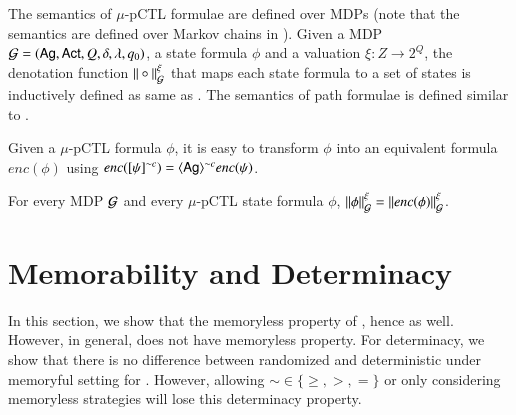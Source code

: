 The semantics of $\mu$-pCTL formulae are defined over MDPs (note that the semantics are defined over Markov chains in \cite{CKP15}).
Given a MDP $\mathcal{G}=(\textsf{Ag},\textsf{Act}, Q, \delta,\lambda,q_0)$, a state formula $\phi$ and a valuation $\xi:Z\rightarrow 2^Q$,
the denotation function $\|\circ\|_{\mathcal{G}}^\xi$ that maps each state formula to a set of states is inductively defined as same as \pamc.
The semantics of path formulae is defined similar to \pamcc.

Given a $\mu$-pCTL formula $\phi$, it is easy to transform $\phi$ into an equivalent \pamcc formula
$enc(\phi)$ using  $enc([\psi]^{\sim c}) = \langle{\textsf{Ag}}\rangle^{\sim c} enc(\psi)$.


\begin{theorem}
For every MDP $\mathcal{G}$ and every $\mu$-pCTL state formula $\phi$, $\|{\phi}\|_{\mathcal{G}}^\xi=\|{enc(\phi)}\|_{\mathcal{G}}^\xi$.
\end{theorem}



\section{Memorability and Determinacy}
In this section, we show that the memoryless property of \pamcc,  hence \pamcs as well.
However, in general, \pamc does not have memoryless property.
For determinacy, we show that there is no difference between randomized and deterministic
under memoryful setting for \pamc. However, allowing $\sim\in\{\geq,>,=\}$ or only considering memoryless strategies
will lose this determinacy property.


